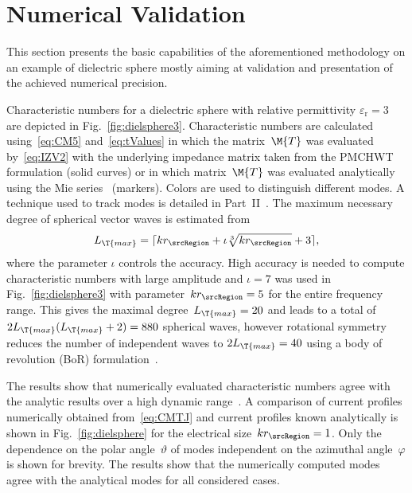 \documentclass[journal]{IEEEtran}
\providecommand{\aCircum}{r_\srcRegion} %
\begin{document}

\section{Numerical Validation}

This section presents the basic capabilities of the aforementioned methodology on an example of dielectric sphere mostly aiming at validation and presentation of the achieved numerical precision.

Characteristic numbers for a dielectric sphere with relative permittivity $\varepsilon_{\mathrm{r}}=3$ are depicted in Fig.~\ref{fig:dielsphere3}. Characteristic numbers are calculated using~\eqref{eq:CM5} and~\eqref{eq:tValues} in which the matrix~$\M{T}$ was evaluated by~\eqref{eq:IZV2} with the underlying impedance matrix taken from the PMCHWT formulation (solid curves) or in which matrix~$\M{T}$ was evaluated analytically using the Mie series~\cite{Kristensson_ScatteringBook} (markers). Colors are used to distinguish different modes. A technique used to track modes is detailed in Part~II~\cite{Gustafsson+etal_CMT2_2021}. The maximum necessary degree of spherical vector waves is estimated from~\cite{JimingSong2001}
\begin{equation}
    \label{eq:Lmax}
    L_\T{max} = \lceil k\aCircum+\iota\sqrt[3]{k\aCircum}+3 \rceil,
\end{equation}
where the parameter $\iota$ controls the accuracy. High accuracy is needed to compute characteristic numbers with large amplitude and $\iota=7$ was used in Fig.~\ref{fig:dielsphere3} with parameter~$k\aCircum=5$ for the entire frequency range. This gives the maximal degree~$L_\T{max}=20$ and leads to a total of $2L_\T{max}(L_\T{max}+2)=880$ spherical waves, however rotational symmetry reduces the number of independent waves to $2L_\T{max}=40$ using a body of revolution (BoR) formulation~\cite{Mautz_RadiationandScatteringFromBodiesofRevolution}.    

The results show that numerically evaluated characteristic numbers agree with the analytic results over a high dynamic range~\cite{TayliEtAl_AccurateAndEfficientEvaluationofCMs}. A comparison of current profiles numerically obtained from~\eqref{eq:CMTJ} and current profiles known analytically is shown in Fig.~\ref{fig:dielsphere} for the electrical size~$k\aCircum=1$. Only the dependence on the polar angle~$\vartheta$ of modes independent on the azimuthal angle~$\varphi$ is shown for brevity. The results show that the numerically computed modes agree with the analytical modes for all considered cases. 
\end{document}
